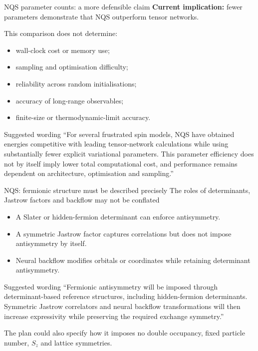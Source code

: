 \documentclass[aspectratio=169,11pt]{beamer}
\begin{document}
\begin{frame}{NQS parameter counts: a more defensible claim}
\textbf{Current implication:} fewer parameters demonstrate that NQS outperform tensor networks.

\medskip
This comparison does not determine:
\begin{itemize}
  \item wall-clock cost or memory use;
  \item sampling and optimisation difficulty;
  \item reliability across random initialisations;
  \item accuracy of long-range observables;
  \item finite-size or thermodynamic-limit accuracy.
\end{itemize}

\begin{block}{Suggested wording}
``For several frustrated spin models, NQS have obtained energies competitive with leading tensor-network calculations while using substantially fewer explicit variational parameters. This parameter efficiency does not by itself imply lower total computational cost, and performance remains dependent on architecture, optimisation and sampling.''
\end{block}
\end{frame}

\begin{frame}{NQS: fermionic structure must be described precisely}
The roles of determinants, Jastrow factors and backflow may not be conflated

\begin{itemize}
  \item A Slater or hidden-fermion determinant can enforce antisymmetry.
  \item A symmetric Jastrow factor captures correlations but does not impose antisymmetry by itself.
  \item Neural backflow modifies orbitals or coordinates while retaining determinant antisymmetry.
\end{itemize}

\begin{block}{Suggested wording}
``Fermionic antisymmetry will be imposed through determinant-based reference structures, including hidden-fermion determinants. Symmetric Jastrow correlators and neural backflow transformations will then increase expressivity while preserving the required exchange symmetry.''
\end{block}

The plan could also specify how it imposes no double occupancy, fixed particle number, $S_z$ and lattice symmetries.
\end{frame}
\end{document}
